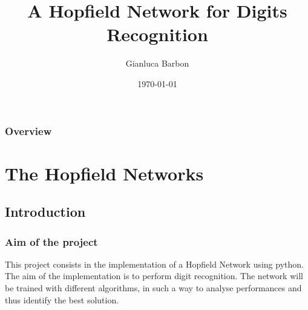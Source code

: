 \documentclass{beamer}
\title[A Hopfield Network for Digits Recognition]{A Hopfield Network for Digits Recognition} %
\author{Gianluca Barbon} %
\institute[UCF] %
{
Universit\`{a} Ca'Foscari Venezia\\ %
\medskip
\textit{gianluca.barbon@gmail.com} %
}
\date{\today} %
\begin{document}
\begin{frame}
\titlepage %
\end{frame}

\begin{frame}
\frametitle{Overview} %
\tableofcontents %
\end{frame}


\section{The Hopfield Networks} %

\subsection{Introduction} %

\begin{frame}
\frametitle{Aim of the project}
This project consists in the implementation of a Hopfield Network using python. The aim of the implementation is to perform digit recognition. The network will be trained with different algorithms, in such a way to analyse performances and thus identify the best solution.
\end{frame}

\end{document}
